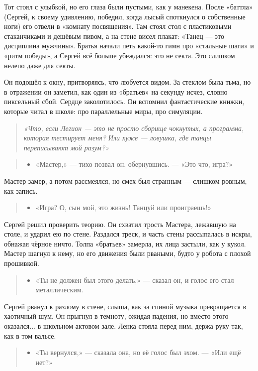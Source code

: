 \documentclass[12pt,a4paper]{book}
\newenvironment{dialogue}{\begin{quote}\itshape\begin{itemize}\item[]}{\end{itemize}\end{quote}}
\newenvironment{innerthought}{\begin{quote}\small\itshape}{\end{quote}}
\begin{document}
Тот стоял с улыбкой, но его глаза были пустыми, как у манекена. После «баттла» (Сергей, к своему удивлению, победил, когда лысый споткнулся о собственные ноги) его отвели в «комнату посвящения». Там стоял стол с пластиковыми стаканчиками и дешёвым пивом, а на стене висел плакат: «Танец — это дисциплина мужчины». Братья начали петь какой-то гимн про «стальные шаги» и «ритм победы», а Сергей всё больше убеждался: это не секта. Это слишком нелепо даже для секты.

Он подошёл к окну, притворяясь, что любуется видом. За стеклом была тьма, но в отражении он заметил, как один из «братьев» на секунду исчез, словно пиксельный сбой. Сердце заколотилось. Он вспомнил фантастические книжки, которые читал в школе: про параллельные миры, про симуляции.

\begin{innerthought}
«Что, если Легион — это не просто сборище чокнутых, а программа, которая тестирует меня? Или хуже — ловушка, где танцы переписывают мой разум?»
\end{innerthought}

\begin{dialogue}
«Мастер,» --- тихо позвал он, обернувшись. --- «Это что, игра?» \\
\end{dialogue}

Мастер замер, а потом рассмеялся, но смех был странным --- слишком ровным, как запись.

\begin{dialogue}
«Игра? О, сын мой, это жизнь! Танцуй или проиграешь!»
\end{dialogue}

Сергей решил проверить теорию. Он схватил трость Мастера, лежавшую на столе, и ударил ею по стене. Раздался треск, и часть стены рассыпалась в искры, обнажая чёрное ничто. Толпа «братьев» замерла, их лица застыли, как у кукол. Мастер шагнул к нему, но его движения были рваными, будто у робота с плохой прошивкой.

\begin{dialogue}
«Ты не должен был этого делать,» --- сказал он, и голос его стал металлическим.
\end{dialogue}

Сергей рванул к разлому в стене, слыша, как за спиной музыка превращается в хаотичный шум. Он прыгнул в темноту, ожидая падения, но вместо этого оказался... в школьном актовом зале. Ленка стояла перед ним, держа руку так, как в том вальсе.

\begin{dialogue}
«Ты вернулся,» --- сказала она, но её голос был эхом. --- «Или ещё нет?» \\
\end{dialogue}
\end{document}
